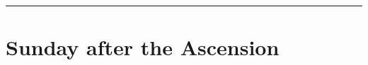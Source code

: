 {{\def\commemorations{If today is April 30 or May 1, \emph{First Vespers of St Joseph the Worker} is commemorated as on page \pageref{stjoseph-worker-commem}.}
\printcommemnote[1]{}
\medskip
\hrule
}

{
\section{Sunday after the Ascension}
\label{easter6}\label{sundayafterascension}
\printcommonvespers{}
\renewcommand{\printhymnnote}{
    \medskip
    \noindent\printnote{Hymn.~\emph{Salútis humánæ Sator}, page \pageref{hymn-salutishumanaesator}.}
    \medskip
    \def\vrlinebreak{T}
    \printvr[\greseteolcustos{manual}]{\vrtex}{\vtranslation}{\rtranslation}
}
\def\precollect{\printvrmanenobiscum}
\benedicamusdomino{}
}
}